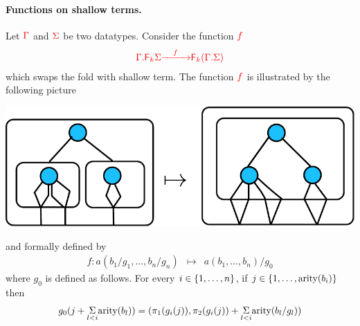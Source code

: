 \paragraph*{Functions on shallow terms.} Let ${\color{red}{\Gamma}}$ and ${\color{red}{\Sigma}}$ be two datatypes.  Consider the function ${\color{red}{f}}$
\begin{align*}
{\color{red}{{\color{red}{\Gamma . {\color{red}{\mathsf F_{k}}}\Sigma}}}} {\color{red}{\xrightarrow{\quad f \quad}}} {\color{red}{{\color{red}{\mathsf F_{k}}}({\color{red}{\Gamma . \Sigma}})}}
\end{align*}
which swaps the fold with shallow term. The function ${\color{red}{f}}$ is illustrated by the following picture
\begin{center}
\includegraphics[scale=.4]{pictures/shallow-fold-distrib}
\end{center}
and formally defined by 
$$\begin{array}{rcl}
f:a(b_1/g_1,\dots,b_n/g_n)&\mapsto& a(b_1,\dots,b_n)/g_0
\end{array}$$
where $g_0$ is defined as follows. For every  $i \in\{1,\dots,n\}$,  if  $j\in\{1,\dots,\mathrm{arity}(b_i)\}$ then 
\begin{align*}
 g_0(j+\underset{l<i}{\Sigma} \mathrm{arity}(b_l))=(\pi_1(g_i(j)),\pi_2(g_i(j))+\underset{l<i}{\Sigma} \mathrm{arity}(b_l/g_l))
\end{align*}
\smallskip

